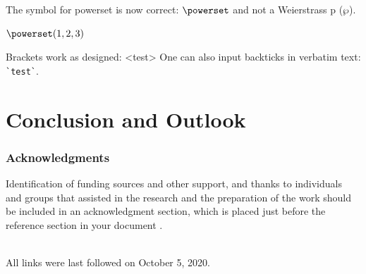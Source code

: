 \begin{ltgexample}
The symbol for powerset is now correct: $\powerset$ and not a Weierstrass p ($\wp$).

$\powerset({1,2,3})$
\end{ltgexample}

\begin{ltgexample}
Brackets work as designed:
<test>
One can also input backticks in verbatim text: \verb|`test`|.
\end{ltgexample}


\section{Conclusion and Outlook}
\label{sec:outlook}
\lipsum[1-2]

\subsubsection*{Acknowledgments}

Identification of funding sources and other support, and thanks to individuals and groups that assisted in the research and the preparation of the work should be included in an acknowledgment section, which is placed just before the reference section in your document \cite{acmart}.


\renewcommand{\bibsection}{\section*{References}} %

\begingroup
  \small %
  
\endgroup

\ \\
%
\noindent
All links were last followed on October 5, 2020.



